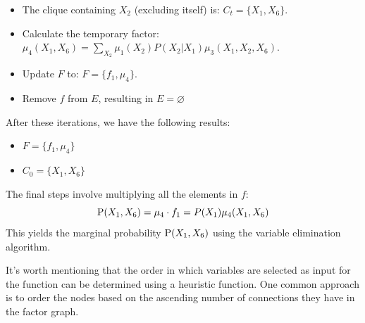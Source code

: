 \documentclass[12pt, a4paper]{report}
\begin{document}
\begin{example}
\begin{itemize}
\begin{itemize}
                    \item The clique containing $X_2$ (excluding itself) is: $C_t=\{X_1,X_6\}$. 
                    \item Calculate the temporary factor: $\mu_4(X_1,X_6)=\sum_{X_2}\mu_1(X_2)P(X_2|X_1)\mu_3(X_1,X_2,X_6)$. 
                    \item Update $F$ to: $F=\{f_1,\mu_4\}$. 
                    \item Remove $f$ from $E$, resulting in $E=\varnothing$
                \end{itemize}
        \end{itemize}
        After these iterations, we have the following results:
        \begin{itemize}
            \item $F=\{f_1,\mu_4\}$
            \item $C_0=\{X_1,X_6\}$
        \end{itemize}
        The final steps involve multiplying all the elements in $f$: 
        \[\textnormal{P}(X_1,X_6)=\mu_4 \cdot f_1=P(X_1)\mu_4(X_1,X_6)\]
        This yields the marginal probability $\textnormal{P}(X_1,X_6)$ using the variable elimination algorithm.
    \end{example}
    It's worth mentioning that the order in which variables are selected as input for the function can be determined using a heuristic function. 
    One common approach is to order the nodes based on the ascending number of connections they have in the factor graph.
\end{document}
